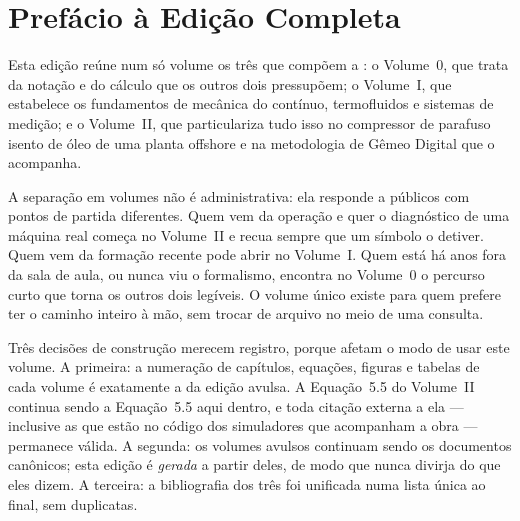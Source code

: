 %
%
\clearpage
\section*{Prefácio à Edição Completa}

Esta edição reúne num só volume os três que compõem a \colecaotitulo: o
Volume~0, que trata da notação e do cálculo que os outros dois pressupõem; o
Volume~I, que estabelece os fundamentos de mecânica do contínuo, termofluidos e
sistemas de medição; e o Volume~II, que particulariza tudo isso no compressor
de parafuso isento de óleo de uma planta offshore e na metodologia de Gêmeo
Digital que o acompanha.

A separação em volumes não é administrativa: ela responde a públicos com
pontos de partida diferentes. Quem vem da operação e quer o diagnóstico de uma
máquina real começa no Volume~II e recua sempre que um símbolo o detiver. Quem
vem da formação recente pode abrir no Volume~I. Quem está há anos fora da sala
de aula, ou nunca viu o formalismo, encontra no Volume~0 o percurso curto que
torna os outros dois legíveis. O volume único existe para quem prefere ter o
caminho inteiro à mão, sem trocar de arquivo no meio de uma consulta.

Três decisões de construção merecem registro, porque afetam o modo de usar
este volume. A primeira: a numeração de capítulos, equações, figuras e tabelas
de cada volume é exatamente a da edição avulsa. A Equação~5.5 do Volume~II
continua sendo a Equação~5.5 aqui dentro, e toda citação externa a ela ---
inclusive as que estão no código dos simuladores que acompanham a obra ---
permanece válida. A segunda: os volumes avulsos continuam sendo os documentos
canônicos; esta edição é \emph{gerada} a partir deles, de modo que nunca
divirja do que eles dizem. A terceira: a bibliografia dos três foi unificada
numa lista única ao final, sem duplicatas.

